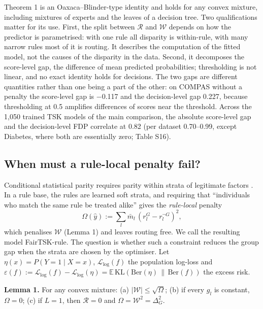 \documentclass[pdflatex,sn-basic,Numbered,lineno]{sn-jnl}
\begin{document}
Theorem 1 is an Oaxaca--Blinder-type identity \cite{oaxaca,blinder} and holds for any convex mixture, including mixtures of experts \cite{jacobs,shazeer} and the leaves of a decision tree. Two qualifications matter for its use. First, the split between \(\mathcal R\) and \(\mathcal W\) depends on how the predictor is parametrised: with one rule all disparity is within-rule, with many narrow rules most of it is routing. It describes the computation of the fitted model, not the causes of the disparity in the data. Second, it decomposes the score-level gap, the difference of mean predicted probabilities; thresholding is not linear, and no exact identity holds for decisions. The two gaps are different quantities rather than one being a part of the other: on COMPAS without a penalty the score-level gap is \ensuremath{-}0.117 and the decision-level gap 0.227, because thresholding at 0.5 amplifies differences of scores near the threshold. Across the 1,050 trained TSK models of the main comparison, the absolute score-level gap and the decision-level FDP correlate at 0.82 (per dataset 0.70--0.99, except Diabetes, where both are essentially zero; Table S16).

\hypertarget{when-must-a-rule-local-penalty-fail}{%
\subsection{When must a rule-local penalty fail?}\label{when-must-a-rule-local-penalty-fail}}

Conditional statistical parity requires parity within strata of legitimate factors \cite{kamiran2013,corbett}. In a rule base, the rules are learned soft strata, and requiring that ``individuals who match the same rule be treated alike'' gives the \emph{rule-local} penalty \[\Omega(\hat y) := \sum_{l}\bar{m}_{l}\,(r_{l}^{G} - r_{l}^{\neg G})^{2}, \tag{5}\] which penalises \(\mathcal W\) (Lemma 1) and leaves routing free. We call the resulting model FairTSK-rule. The question is whether such a constraint reduces the group gap when the strata are chosen by the optimiser. Let \(\eta(x) = P(Y = 1 \mid X = x)\), \(\mathcal{L}_{\log}(f)\) the population log-loss and \(\varepsilon(f) := \mathcal{L}_{\log}(f) - \mathcal{L}_{\log}(\eta) = \mathbb{E}\,\mathrm{KL}(\mathrm{Ber}(\eta)\,\|\,\mathrm{Ber}(f))\) the excess risk.

\textbf{Lemma 1.} For any convex mixture: (a) \(|\mathcal{W}| \leq \sqrt{\Omega}\); (b) if every \(g_l\) is constant, \(\Omega = 0\); (c) if \(L = 1\), then \(\mathcal{R} = 0\) and \(\Omega = \mathcal W^2 = \Delta_{G}^{2}\).
\end{document}
